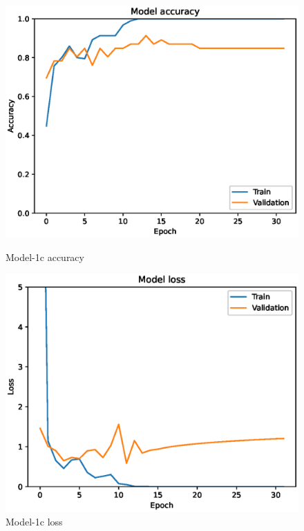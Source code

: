 \begin{figure}
    \centering
    \begin{minipage}{0.45\textwidth}
        \centering
        \includegraphics[width=\textwidth]{./fig/accuracy1c.eps}
        \caption{Model-1c accuracy}
        \label{fig:model1c_acc}
    \end{minipage}
    \begin{minipage}{0.45\textwidth}
        \centering
        \includegraphics[width=\textwidth]{./fig/loss1c.eps}
        \caption{Model-1c loss}
        \label{fig:model1c_loss}
    \end{minipage}
\end{figure}


